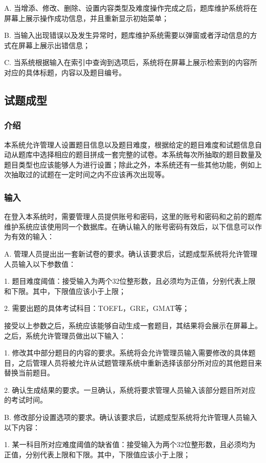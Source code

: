 A. 当增添、修改、删除、设置内容类型及难度操作完成之后，题库维护系统将在屏幕上展示操作成功信息，并且重新显示初始菜单；

B. 当输入出现错误以及发生异常时，题库维护系统需要以弹窗或者浮动信息的方式在屏幕上展示出错信息；

C. 当系统根据输入在索引中查询到选项后，系统将在屏幕上展示检索到的内容所对应的具体标题，内容以及题目编号。

\subsection{试题成型}

\subsubsection{介绍}
本系统允许管理人设置题目信息以及题目难度，根据给定的题目难度和试题信息自动从题库中选择相应的题目拼成一套完整的试卷。本系统每次所抽取的题目数量及题目类型也应该能够人为进行设置；除此之外，本系统还有一些其他功能，例如上次抽取过的试题在一定时间之内不应该再次出现等。

\subsubsection{输入}
在登入本系统时，需要管理人员提供账号和密码，这里的账号和密码和之前的题库维护系统应该使用同一个数据库。在确认输入的账号密码有效后，以下信息可以作为有效的输入：

A. 管理人员提出出一套新试卷的要求。确认该要求后，试题成型系统将允许管理人员输入以下参数值：

	1. 题目难度阈值：接受输入为两个32位整形数，且必须均为正值，分别代表上限和下限。其中，下限值应该小于上限；

	2. 需要出题的具体考试科目：TOEFL，GRE，GMAT等；

	接受以上参数之后，系统应该能够自动生成一套题目，其结果将会展示在屏幕上。之后，系统允许管理员做出以下输入：

	1. 修改其中部分题目的内容的要求。系统将会允许管理员输入需要修改的具体题目，之后管理人员将被允许从试题管理系统中重新选择该部分所对应的其他题目来替换当前题目。

	2. 确认生成结果的要求。一旦确认，系统将要求管理人员输入该部分题目所对应的考试时间。

B. 修改部分设置选项的要求。确认该要求后，试题成型系统将允许管理人员输入以下内容：

	1. 某一科目所对应难度阈值的缺省值：接受输入为两个32位整形数，且必须均为正值，分别代表上限和下限。其中，下限值应该小于上限；

